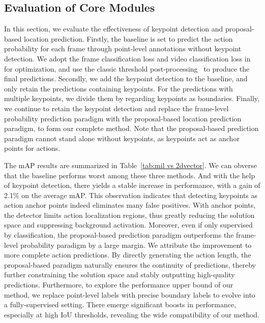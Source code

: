 \documentclass[final]{cvpr}
\begin{document}
\subsection{Evaluation of Core Modules}
In this section, we evaluate the effectiveness of keypoint detection and proposal-based location prediction.
Firstly, the baseline is set to predict the action probability for each frame through point-level annotations without keypoint detection. We adopt the frame classification loss and video classification loss in~\cite{ma2020sf} for optimization, and use the classic threshold post-processing~\cite{ma2020sf,shi2020weakly,liu2019completeness} to produce the final predictions. Secondly, we add the keypoint detection to the baseline, and only retain the predictions containing keypoints. For the predictions with multiple keypoints, we divide them by regarding keypoints as boundaries.
Finally, we continue to retain the keypoint detection and replace the frame-level probability prediction paradigm with the proposal-based location prediction paradigm, to form our complete method.
Note that the proposal-based prediction paradigm cannot stand alone without keypoints, as keypoints act as anchor points for actions.




The mAP results are summarized in Table~\ref{tab:mil vs 2dvector}.
We can obverse that the baseline performs worst among these three methods. And with the help of keypoint detection, there yields a stable increase in performance, with a gain of 2.1\% on the average mAP. This observation indicates that detecting keypoints as action anchor points indeed eliminates many false positives.
With anchor points, the detector limits action localization regions, thus greatly reducing the solution space and suppressing background activation.
Moreover, even if only supervised by classification, the proposal-based prediction paradigm outperforms the frame-level probability paradigm by a large margin. We attribute the improvement to more complete action predictions. By directly generating the action length, the proposal-based paradigm naturally ensures the continuity of predictions, thereby further constraining the solution space and stably outputting high-quality predictions.
Furthermore, to explore the performance upper bound of our method, we replace point-level labels with precise boundary labels to evolve into a fully-supervised setting. There emerge significant boosts in performance, especially at high IoU thresholds, revealing the wide compatibility of our method.
\end{document}
